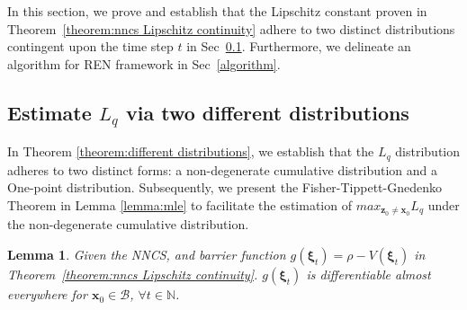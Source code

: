 \documentclass[conference]{IEEEtran}
\newtheorem{lemma}{\bf Lemma}
\newcommand{\ren}{\textsc{REN}\xspace}
\newcommand{\nncs}{\textsc{NNCS}\xspace}
\newcommand{\myvec}[1]{\boldsymbol{#1}}
\newcommand{\calB}{\mathcal{B}}
\newcommand{\bbN}{\mathbb{N}}
\begin{document}
In this section, we prove and establish 
that the Lipschitz constant proven in 
Theorem~\ref{theorem:nncs Lipschitz continuity} 
adhere to two distinct 
distributions contingent upon the time step $t$ 
in Sec~\ref{sec:esimate in two distributions}.  
Furthermore, we delineate an algorithm 
for \ren framework 
in Sec~\ref{algorithm}. 

\subsection{Estimate $L_{q}$ via two different distributions}\label{sec:esimate in two distributions}

In Theorem \ref{theorem:different distributions}, 
we establish that the $L_{q}$ distribution adheres 
to two distinct forms: a non-degenerate cumulative 
distribution and a One-point distribution. 
Subsequently, we present the Fisher-Tippett-Gnedenko 
Theorem in Lemma \ref{lemma:mle} to facilitate the 
estimation of $max_{\myvec{z}_{0}\neq\myvec{x}_{0}}L_{q}$ under the non-degenerate 
cumulative distribution.

\begin{lemma}\label{lemma:differentiable}
    Given the \nncs, and 
    barrier function $g(\myvec{\xi}_{t}) = \rho - V(\myvec{\xi}_{t})$  
    in Theorem~\ref{theorem:nncs Lipschitz continuity}. 
    $g(\myvec{\xi}_{t})$ is differentiable almost everywhere 
    for $\myvec{x}_{0} \in \calB$, $\forall t \in \bbN$.  
\end{lemma}
\end{document}

